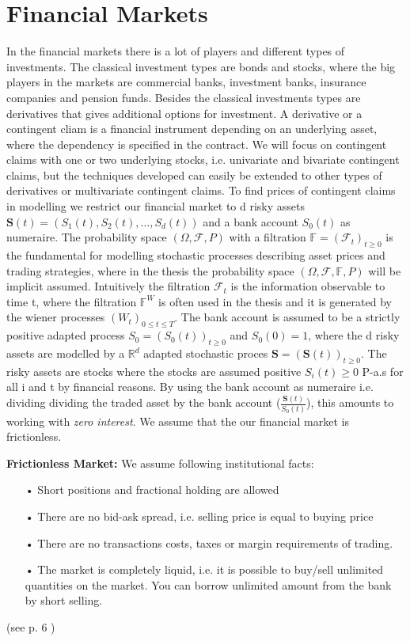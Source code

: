 \section{Financial Markets}\label{FinMarket}
In the financial markets there is a lot of players and different types of investments. The classical investment types are bonds and stocks, where the big players in the markets are commercial banks, investment banks, insurance companies and pension funds. Besides the classical investments types are derivatives that gives additional options for investment. A derivative or a contingent cliam is a financial instrument depending on an underlying asset, where the dependency is specified in the contract. We will focus on contingent claims with one or two underlying stocks, i.e. univariate and bivariate contingent claims, but the techniques developed can easily be extended to other types of derivatives or multivariate contingent claims. To find prices of contingent claims in modelling we restrict our financial market to d risky assets $\bm{S}(t)=(S_1(t), S_2(t),\ldots, S_d(t))$ and a bank account $S_0(t)$ as numeraire. The probability space $(\Omega, \mathcal{F}, P)$ with a filtration $\mathbb{F}=(\mathcal{F}_t)_{t\geq 0}$ is the fundamental for modelling stochastic processes describing asset prices and trading strategies, where in the thesis the probability space $(\Omega, \mathcal{F}, \mathbb{F}, P)$ will be implicit assumed. Intuitively the filtration $\mathcal{F}_t$ is the information observable to time t, where the filtration $\mathbb{F}^{W}$ is often used in the thesis and it is generated by the wiener processes $(W_t)_{0\leq t \leq T}$. The bank account is assumed to be a strictly positive adapted process $S_0=(S_0 (t))_{t \geq 0}$ and $S_0(0)=1$, where the d risky assets are modelled by a $\mathbb{R}^d$ adapted stochastic proces $\bm{S}=(\bm{S}(t))_{t\geq 0}$. The risky assets are stocks where the stocks are assumed positive $S_i(t)\geq 0$ P-a.s for all i and t by financial reasons. By using the bank account as numeraire i.e. dividing dividing the traded asset by the bank account ($\frac{\bm{S}(t)}{S_0 (t)}$), this amounts to working with \textit{zero interest}. We assume that the our financial market is frictionless.
\theoremstyle{assumption}
\begin{assumption}{\textbf{Frictionless Market: }}\label{EfficientMarket}
We assume following institutional facts:
\begin{enumerate}
\item[•] Short positions and fractional holding are allowed 
\item[•] There are no bid-ask spread, i.e. selling price is equal to buying price
\item[•] There are no transactions costs, taxes or margin requirements of trading.
\item[•] The market is completely liquid, i.e. it is possible to buy/sell unlimited quantities on the market. You can borrow unlimited amount from the bank by short selling.
\end{enumerate}
(see p. 6 \parencite{finKont})
\end{assumption}
